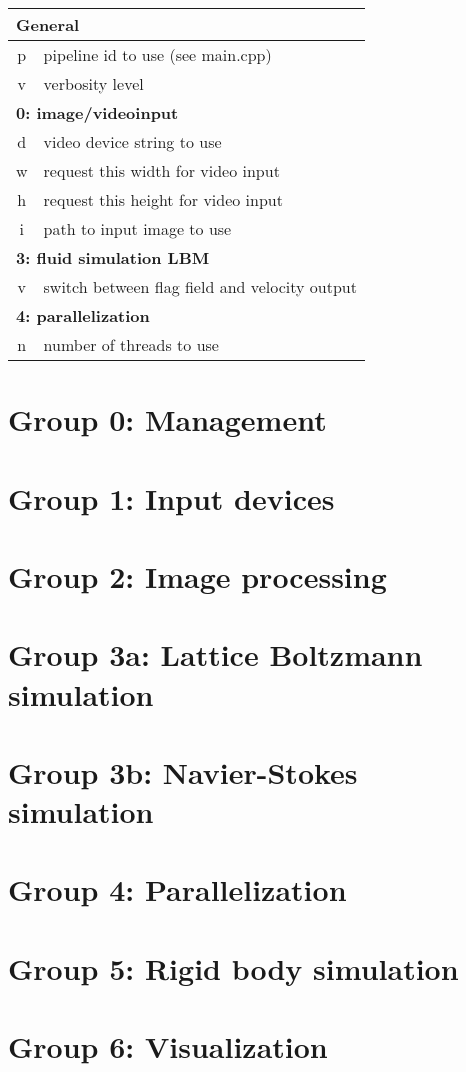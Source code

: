 \documentclass[11pt,a4paper]{article}
\begin{document}
\noindent
\begin{tabular}{|c|l|}
	\hline
	\multicolumn{2}{|l|}{\textbf{General}}	\\
	\hline
	p	& pipeline id to use (see main.cpp)	\\
	\hline
	v	& verbosity level	\\
	\hline
	\hline

	\multicolumn{2}{|l|}{\textbf{0: image/videoinput}}	\\
	\hline
	d	& video device string to use\\
	\hline
	w	& request this width for video input\\
	\hline
	h	& request this height for video input\\
	\hline
	i	& path to input image to use\\
	\hline
	\hline

	\multicolumn{2}{|l|}{\textbf{3: fluid simulation LBM}}	\\
	\hline
	v	& switch between flag field and velocity output	\\
	\hline
	\hline
	
	\multicolumn{2}{|l|}{\textbf{4: parallelization}}	\\
	\hline
	n	& number of threads to use\\
	\hline
	\hline

\end{tabular}

\section{Group 0: Management}



\section{Group 1: Input devices}



\section{Group 2: Image processing}



\section{Group 3a: Lattice Boltzmann simulation}



\section{Group 3b: Navier-Stokes simulation}



\section{Group 4: Parallelization}



\section{Group 5: Rigid body simulation}



\section{Group 6: Visualization}


  
\end{document}
